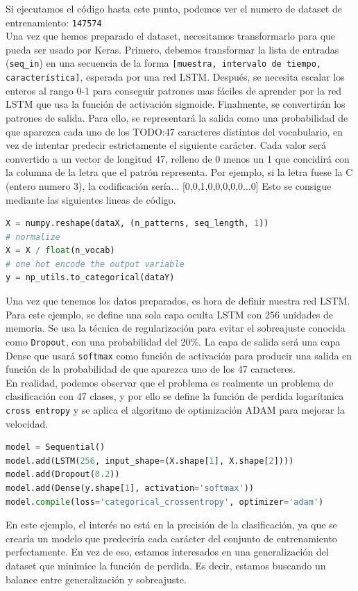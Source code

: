 Si ejecutamos el código hasta este punto, podemos ver el numero de dataset de entrenamiento: \lstinline{147574}\\
Una vez que hemos preparado el dataset, necesitamos transformarlo para que pueda ser usado por Keras. Primero, debemos transformar la lista de entradas (\lstinline{seq_in}) en una secuencia de la forma \lstinline{[muestra, intervalo de tiempo, característica]}, esperada por una red LSTM. Después, se necesita escalar los enteros al rango 0-1 para conseguir patrones mas fáciles de aprender por la red LSTM que usa la función de activación sigmoide. Finalmente, se convertirán los patrones de salida. Para ello, se representará la salida como una probabilidad de que aparezca cada uno de los TODO:47 caracteres distintos del vocabulario, en vez de intentar predecir estrictamente el siguiente carácter. Cada valor será convertido a un vector de longitud 47, relleno de 0 menos un 1 que concidirá con la columna de la letra que el patrón representa. Por ejemplo, si la letra fuese la C (entero numero 3), la codificación sería... [0,0,1,0,0,0,0,0...0]
Esto se consigue mediante las siguientes lineas de código.
\begin{lstlisting}[language=Python]
X = numpy.reshape(dataX, (n_patterns, seq_length, 1))
# normalize
X = X / float(n_vocab)
# one hot encode the output variable
y = np_utils.to_categorical(dataY)
\end{lstlisting}
Una vez que tenemos los datos preparados, es hora de definir nuestra red LSTM. Para este ejemplo, se define una sola capa oculta LSTM con 256 unidades de memoria. Se usa la técnica de regularización para evitar el sobreajuste conocida como \lstinline{Dropout}, con una probabilidad del 20\%. La capa de salida será una capa Dense que usará \lstinline{softmax} como función de activación para producir una salida en función de la probabilidad de que aparezca uno de los 47 caracteres.\\
En realidad, podemos observar que el problema es realmente un problema de clasificación con 47 clases, y por ello se define la función de perdida logarítmica \lstinline{cross entropy} y se aplica el algoritmo de optimización ADAM para mejorar la velocidad.
\begin{lstlisting}[language=Python]
model = Sequential()
model.add(LSTM(256, input_shape=(X.shape[1], X.shape[2])))
model.add(Dropout(0.2))
model.add(Dense(y.shape[1], activation='softmax'))
model.compile(loss='categorical_crossentropy', optimizer='adam')
\end{lstlisting}
En este ejemplo, el interés no está en la precisión de la clasificación, ya que se crearía un modelo que predeciría cada carácter del conjunto de entrenamiento perfectamente. En vez de eso, estamos interesados en una generalización del dataset que minimice la función de perdida. Es decir, estamos buscando un balance entre generalización y sobreajuste.\\
